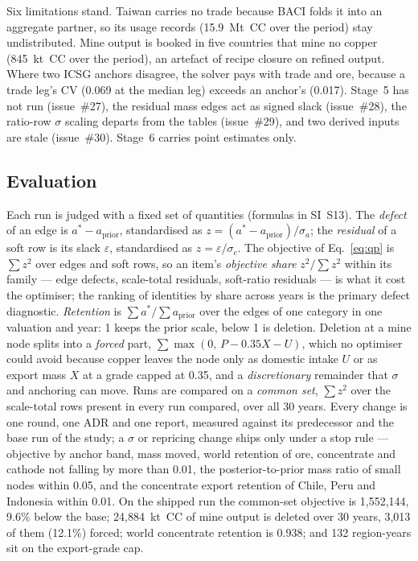 Six limitations stand. Taiwan carries no trade because BACI folds it into an
aggregate partner, so its usage records (15.9~Mt~CC over the period) stay
undistributed. Mine output is booked in five countries that mine no copper
(845~kt~CC over the period), an artefact of recipe closure on refined output.
Where two ICSG anchors disagree, the solver pays with trade and ore, because
a trade leg's CV (0.069 at the median leg) exceeds an anchor's (0.017).
Stage~5 has not run (issue~\#27), the residual mass edges act as signed
slack (issue~\#28), the ratio-row $\sigma$ scaling departs from the tables
(issue~\#29), and two derived inputs are stale (issue~\#30). Stage~6
carries point estimates only.

\subsection{Evaluation}\label{sec:evaluation}

Each run is judged with a fixed set of quantities (formulas in SI~S13). The
\emph{defect} of an edge is $a^* - a_{\mathrm{prior}}$, standardised as $z =
(a^* - a_{\mathrm{prior}})/\sigma_a$; the \emph{residual} of a soft row is
its slack $\varepsilon$, standardised as $z = \varepsilon/\sigma_c$. The
objective of Eq.~\eqref{eq:qp} is $\sum z^2$ over edges and soft rows, so an
item's \emph{objective share} $z^2/\sum z^2$ within its family --- edge
defects, scale-total residuals, soft-ratio residuals --- is what it cost the
optimiser; the ranking of identities by share across years is the primary
defect diagnostic. \emph{Retention} is $\sum a^*/\sum a_{\mathrm{prior}}$
over the edges of one category in one valuation and year: 1 keeps the prior
scale, below 1 is deletion. Deletion at a mine node splits into a
\emph{forced} part, $\sum \max(0,\, P - 0.35X - U)$, which no optimiser
could avoid because copper leaves the node only as domestic intake $U$ or as
export mass $X$ at a grade capped at 0.35, and a \emph{discretionary}
remainder that $\sigma$ and anchoring can move. Runs are compared on a
\emph{common set}, $\sum z^2$ over the scale-total rows present in every run
compared, over all 30 years. Every change is one round, one ADR and one
report, measured against its predecessor and the base run of the study; a
$\sigma$ or repricing change ships only under a stop rule --- objective by
anchor band, mass moved, world retention of ore, concentrate and cathode not
falling by more than 0.01, the posterior-to-prior mass ratio of small nodes
within 0.05, and the concentrate export retention of Chile, Peru and
Indonesia within 0.01. On the shipped run the common-set objective is
1{,}552{,}144, 9.6\% below the base; 24{,}884~kt~CC of mine output is
deleted over 30 years, 3{,}013 of them (12.1\%) forced; world concentrate
retention is 0.938; and 132 region-years sit on the export-grade cap.

